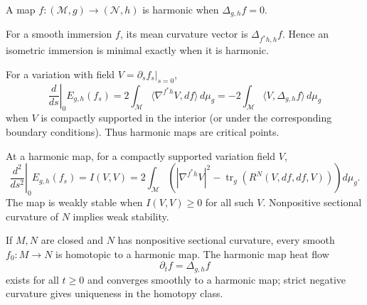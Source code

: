 \begin{definition}
\label{def:chow-iv-k12-harmonic-map}
A map $f:(\mathcal M,g)\to(\mathcal N,h)$ is harmonic when
$\Delta_{g,h}f=0$.
\end{definition}

\begin{example}
\label{ex:chow-iv-k13-minimal-immersion}
For a smooth immersion $f$, its mean curvature vector is
$\Delta_{f^*h,h}f$.  Hence an isometric immersion is minimal exactly when it
is harmonic.
\end{example}

\begin{lemma}
\label{lem:chow-iv-k14-first-variation}
For a variation with field $V=\partial_sf_s|_{s=0}$,
\[
\left.\frac{d}{ds}\right|_{0}E_{g,h}(f_s)=
2\int_{\mathcal M}\langle\nabla^{f^*h}V,df\rangle\,d\mu_g
=-2\int_{\mathcal M}\langle V,\Delta_{g,h}f\rangle\,d\mu_g
\]
when $V$ is compactly supported in the interior (or under the corresponding
boundary conditions).  Thus harmonic maps are critical points.
\end{lemma}

\begin{lemma}
\label{lem:chow-iv-k15-second-variation}
At a harmonic map, for a compactly supported variation field $V$,
\[
\left.\frac{d^2}{ds^2}\right|_0E_{g,h}(f_s)=I(V,V)
=2\int_{\mathcal M}\left(|\nabla^{f^*h}V|^2-
\operatorname{tr}_g(R^N(V,df,df,V))\right)d\mu_g.
\]
The map is weakly stable when $I(V,V)\ge0$ for all such $V$.  Nonpositive
sectional curvature of $N$ implies weak stability.
\end{lemma}

\begin{theorem}
\label{thm:chow-iv-k17-eells-sampson}
If $M,N$ are closed and $N$ has nonpositive sectional curvature, every smooth
$f_0:M\to N$ is homotopic to a harmonic map.  The harmonic map heat flow
\[
\partial_tf=\Delta_{g,h}f
\]
exists for all $t\ge0$ and converges smoothly to a harmonic map; strict
negative curvature gives uniqueness in the homotopy class.
\end{theorem}

